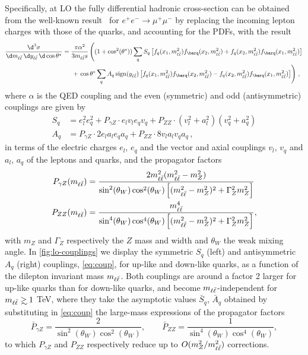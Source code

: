 Specifically, at LO the fully differential hadronic cross-section can
be obtained from the well-known result~\cite{Peskin:1995ev} for
$e^+e^-\to\mu^+\mu^-$ by replacing the incoming lepton charges  with
those of the quarks, and accounting for the PDFs, with
the result
\begin{align}
    \frac{\d^3 \sigma}{\d \mll \, \d \yll \, \d\cos\theta^*} &= \frac{\pi \alpha^2}{3 \mll s} \left((1+\cos^2({\theta^*})) \sum_q S_q \left[f_q(x_1,\mll^2) f_{\barq}(x_2,\mll^2) + f_q(x_2,\mll^2) f_{\barq}(x_1,\mll^2) \right] \right. \nonumber\\
    &\hspace*{15pt} + \left. \cos\theta^* \sum_q A_q \sign (\yll) \left[ f_q(x_1,\mll^2) f_{\barq}(x_2,\mll^2) - f_q(x_2,\mll^2) f_{\barq}(x_1,\mll^2)\right] \right) \, ,
    \label{eq:lo-triple-diff}
\end{align}
where  $\alpha$ is the QED coupling and the even (symmetric) and
odd  (antisymmetric) couplings are given by
\begin{align}
  \label{eq:coup}
    S_q &= e_l^2 e_q^2 + P_{\gamma Z} \cdot  e_l v_l e_q v_q + P_{ZZ} \cdot  (v_l^2+a_l^2)(v_q^2+a_q^2) \nonumber \\
    A_q &= P_{\gamma Z} \cdot 2 e_l a_l e_q a_q  + P_{ZZ} \cdot 8 v_l a_l  v_q a_q \, ,
\end{align}
in terms of the electric charges  $e_l$, $e_q$ and the vector and
axial couplings $v_l$, $v_q$ and $a_l$, $a_q$  of the leptons and
quarks, and the propagator factors
\begin{align}\label{eq:propgz}
    P_{\gamma Z}(m_{\ell\bar{\ell}}) &= \frac{2m_{\ell\bar{\ell}}^2 (m_{\ell\bar{\ell}}^2  - m_Z^2)}{\sin^2(\theta_W) \cos^2(\theta_W)\left[(m_{\ell\bar{\ell}}^2 - m_Z^2)^2 + \Gamma_Z^2 m_Z^2\right]}\\
\label{eq:propzz}
    P_{ZZ}(m_{\ell\bar{\ell}}) &= \frac{m_{\ell\bar{\ell}}^4}{\sin^4(\theta_W) \cos^4(\theta_W)\left[(m_{\ell\bar{\ell}}^2 - m_Z^2)^2 + \Gamma_Z^2 m_Z^2\right]},
\end{align}
with $m_Z$  and $\Gamma_Z$ respectively the $Z$ mass and width and $\theta_W$ the weak mixing angle.
%
In \cref{fig:lo-couplings} we display the
symmetric $S_q$ (left) and antisymmetric $A_q$ (right)
couplings, \cref{eq:coup}, for up-like and
down-like quarks, as a function of 
the dilepton invariant mass $m_{\ell\bar{\ell}}$.
%
Both couplings are around a factor 2 larger for
up-like quarks than for down-like quarks, and
become $m_{\ell\bar{\ell}}$-independent for $\mll \gsim 1$ TeV, where they take
the asymptotic values $\bar S_q$, $\bar A_q$ obtained by
substituting in \cref{eq:coup} the large-mass expressions of
the propagator factors
\begin{equation}\label{eq:propasympt}
    \bar P_{\gamma Z} = \frac{2}{\sin^2(\theta_W)\cos^2(\theta_W)},
    \qquad 
    \bar P_{ZZ} = \frac{1}{\sin^4(\theta_W) \cos^4(\theta_W)},
\end{equation}
to which $P_{\gamma Z}$ and $P_{ZZ}$ respectively reduce up to $O(m^2_Z/m_{\ell\bar{\ell}}^2)$ corrections.

